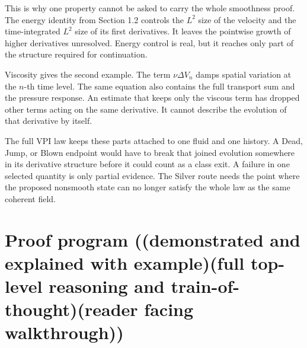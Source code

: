 This is why one property cannot be asked to carry the whole smoothness proof.
The energy identity from Section 1.2 controls the \(L^2\) size of the velocity
and the time-integrated \(L^2\) size of its first derivatives.  It leaves the
pointwise growth of higher derivatives unresolved.  Energy control is real,
but it reaches only part of the structure required for continuation.

Viscosity gives the second example.  The term \(\nu\Delta V_n\) damps spatial
variation at the \(n\)-th time level.  The same equation also contains the full
transport sum and the pressure response.  An estimate that keeps only the
viscous term has dropped other terms acting on the same derivative.  It cannot
describe the evolution of that derivative by itself.

The full VPI law keeps these parts attached to one fluid and one history.  A
Dead, Jump, or Blown endpoint would have to break that joined evolution
somewhere in its derivative structure before it could count as a class exit.
A failure in one selected quantity is only partial evidence.  The Silver route
needs the point where the proposed nonsmooth state can no longer satisfy the
whole law as the same coherent field.

\section{Proof program ((demonstrated and explained with example)(full top-level reasoning and train-of-thought)(reader facing walkthrough))}
